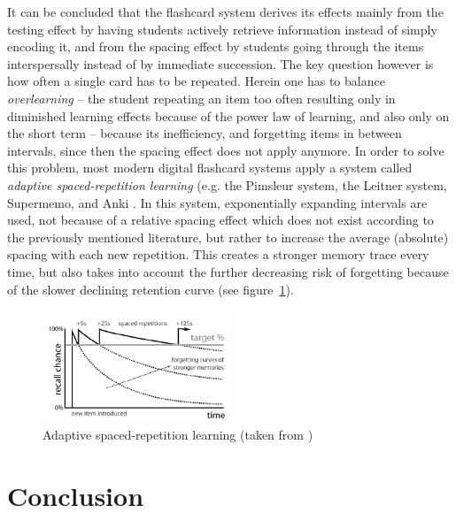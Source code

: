 It can be concluded that the flashcard system derives its effects mainly from the testing effect by having students actively retrieve information instead of simply encoding it, and from the spacing effect by students going through the items interspersally instead of by immediate succession. The key question however is how often a single card has to be repeated. Herein one has to balance \emph{overlearning} -- the student repeating an item too often resulting only in diminished learning effects because of the power law of learning, and also only on the short term \cite{rohrer} -- because its inefficiency, and forgetting items in between intervals, since then the spacing effect does not apply anymore. In order to solve this problem, most modern digital flashcard systems apply a system called \emph{adaptive spaced-repetition learning} (e.g. the Pimsleur system, the Leitner system, Supermemo, and Anki \cite{microlearning}. In this system, exponentially expanding intervals are used, not because of a relative spacing effect which does not exist according to the previously mentioned literature, but rather to increase the average (absolute) spacing with each new repetition. This creates a stronger memory trace every time, but also takes into account the further decreasing risk of forgetting because of the slower declining retention curve (see figure~\ref{fig:spacedrepetition}).

\begin{figure}
    \centering
    \includegraphics[width=0.5\textwidth]{img/spacedrepetition}
    \caption{Adaptive spaced-repetition learning (taken from \protect{})}
    \label{fig:spacedrepetition}
\end{figure}

\section{Conclusion}

